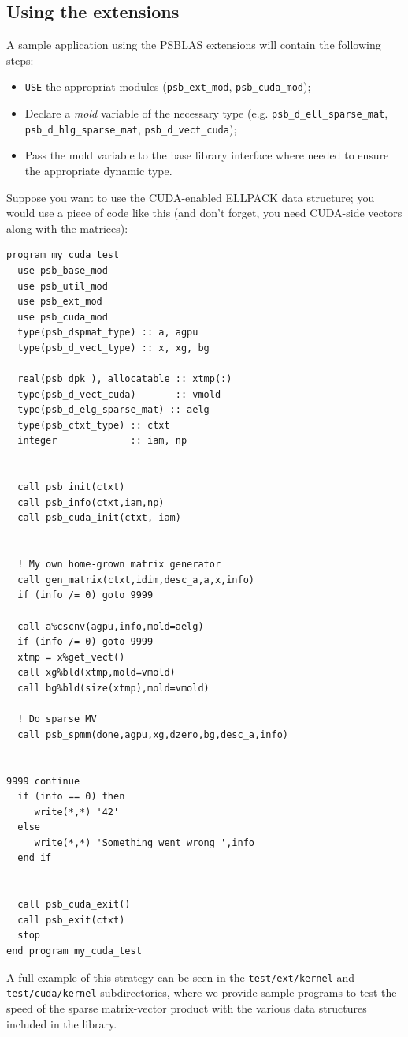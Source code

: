 \subsection{Using the extensions}
\label{sec:ext-appstruct}
A sample application using the PSBLAS extensions will contain the
following steps:
\begin{itemize}
\item \verb|USE| the appropriat modules (\verb|psb_ext_mod|,
  \verb|psb_cuda_mod|);
\item Declare a \emph{mold} variable of the necessary type
  (e.g. \verb|psb_d_ell_sparse_mat|, \verb|psb_d_hlg_sparse_mat|,
  \verb|psb_d_vect_cuda|);
\item Pass the mold variable to the base library interface where
  needed to ensure the appropriate dynamic type.
\end{itemize}
Suppose you want to use the CUDA-enabled ELLPACK data structure; you
would use a piece of code like this (and don't forget, you need
CUDA-side vectors along with the matrices):
\begin{verbatim}
program my_cuda_test
  use psb_base_mod
  use psb_util_mod 
  use psb_ext_mod
  use psb_cuda_mod
  type(psb_dspmat_type) :: a, agpu
  type(psb_d_vect_type) :: x, xg, bg

  real(psb_dpk_), allocatable :: xtmp(:)
  type(psb_d_vect_cuda)       :: vmold
  type(psb_d_elg_sparse_mat) :: aelg
  type(psb_ctxt_type) :: ctxt
  integer             :: iam, np


  call psb_init(ctxt)
  call psb_info(ctxt,iam,np)
  call psb_cuda_init(ctxt, iam)

  
  ! My own home-grown matrix generator
  call gen_matrix(ctxt,idim,desc_a,a,x,info)
  if (info /= 0) goto 9999

  call a%cscnv(agpu,info,mold=aelg)
  if (info /= 0) goto 9999
  xtmp = x%get_vect() 
  call xg%bld(xtmp,mold=vmold)
  call bg%bld(size(xtmp),mold=vmold)
  
  ! Do sparse MV
  call psb_spmm(done,agpu,xg,dzero,bg,desc_a,info)

 
9999 continue
  if (info == 0) then 
     write(*,*) '42'
  else
     write(*,*) 'Something went wrong ',info
  end if
  
  
  call psb_cuda_exit()
  call psb_exit(ctxt)
  stop
end program my_cuda_test
\end{verbatim}
A full example of this strategy can be seen in the
\texttt{test/ext/kernel} and \texttt{test/\-cuda/\-kernel} subdirectories,
where we provide  sample programs 
to test the speed of the sparse matrix-vector product with the various
data structures included in the library. 


